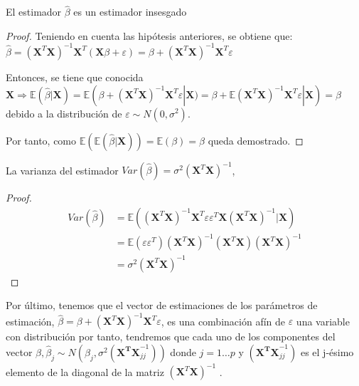 \begin{propo}
El estimador $\hat{\beta}$ es un estimador insesgado \cite{Greene 2008}
\begin{proof}  

\noindent Teniendo en cuenta las hipótesis anteriores, se obtiene que: $\hat{\beta}=(\mathbf{X}^T\mathbf{X})^{-1}\mathbf{X}^T(\mathbf{X}\beta+\varepsilon)=\beta+(\mathbf{X}^T\mathbf{X})^{-1}\mathbf{X}^T \varepsilon$

\noindent Entonces, se tiene que conocida $\mathbf{X} \Rightarrow \mathbb{E}(\hat{\beta}|\mathbf{X})=\mathbb{E}(\beta+(\mathbf{X}^T\mathbf{X})^{-1}\mathbf{X}^T \varepsilon|\mathbf{X})=\beta +\mathbb{E}(\mathbf{X}^T\mathbf{X})^{-1}\mathbf{X}^T \varepsilon|\mathbf{X})=\beta$ debido a la distribución de $\varepsilon\sim N(0,\sigma^2)$.

\noindent Por tanto, como $\mathbb{E}(\mathbb{E}(\hat{\beta}|\mathbf{X}))=\mathbb{E}(\beta)=\beta$ queda demostrado. 
\end{proof}
\end{propo}
\begin{propo}
La varianza del estimador $Var(\hat{\beta})= \sigma^2 (\mathbf{X}^T \mathbf{X})^{-1}$\cite{Hastie 2001},\cite{Greene 2008}
\begin{proof}
\begin{equation}
\begin{split}
Var(\hat{\beta})&=\mathbb{E}((\mathbf{X}^T \mathbf{X})^{-1}\mathbf{X}^T \varepsilon \varepsilon^T\mathbf{X}(\mathbf{X}^T \mathbf{X})^{-1}|\mathbf{X})\\
&=\mathbb{E}(\varepsilon\varepsilon^T) (\mathbf{X}^T \mathbf{X})^{-1}(\mathbf{X}^T \mathbf{X})(\mathbf{X}^T \mathbf{X})^{-1} \\
&=\sigma^2 (\mathbf{X}^T \mathbf{X})^{-1}
\end{split}
\end{equation}\qedhere
\end{proof}
\end{propo}
\noindent Por último, tenemos que el vector de estimaciones de los parámetros de estimación, $\hat{\beta}= \beta+(\mathbf{X}^T\mathbf{X})^{-1}\mathbf{X}^T \varepsilon$, es una combinación afín de $\varepsilon$ una variable con distribución por tanto, tendremos que cada uno de los componentes del vector $\hat{\beta},\hat{\beta}_j\sim N(\beta_j, \sigma^2(\mathbf{X^TX}_{jj}^{-1}))$ donde $ j=1\ldots p$ y $(\mathbf{X^TX}_{jj}^{-1})$ es el j-ésimo elemento de la diagonal de la matriz $(\mathbf{X}^T\mathbf{X})^{-1}$ \cite{Johnson 2007}.

